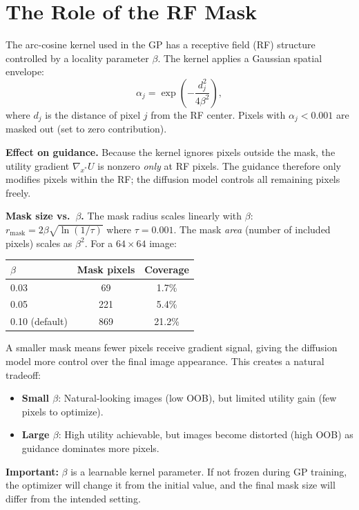 \documentclass[11pt]{article}
\begin{document}
\section{The Role of the RF Mask}

The arc-cosine kernel used in the GP has a receptive field (RF) structure
controlled by a locality parameter $\beta$.
The kernel applies a Gaussian spatial envelope:
\[
  \alpha_j = \exp\!\left(-\frac{d_j^2}{4\beta^2}\right),
\]
where $d_j$ is the distance of pixel $j$ from the RF center.
Pixels with $\alpha_j < 0.001$ are masked out (set to zero contribution).

\medskip
\noindent\textbf{Effect on guidance.}
Because the kernel ignores pixels outside the mask, the utility gradient
$\nabla_{x^*} U$ is nonzero \emph{only} at RF pixels.
The guidance therefore only modifies pixels within the RF;
the diffusion model controls all remaining pixels freely.

\medskip
\noindent\textbf{Mask size vs.\ $\beta$.}
The mask radius scales linearly with $\beta$:
$r_{\text{mask}} = 2\beta\sqrt{\ln(1/\tau)}$ where $\tau = 0.001$.
The mask \emph{area} (number of included pixels) scales as $\beta^2$.
For a $64 \times 64$ image:

\begin{center}
\begin{tabular}{@{}lcc@{}}
\toprule
$\beta$ & Mask pixels & Coverage \\
\midrule
0.03 & 69 & 1.7\% \\
0.05 & 221 & 5.4\% \\
0.10 (default) & 869 & 21.2\% \\
\bottomrule
\end{tabular}
\end{center}

A smaller mask means fewer pixels receive gradient signal, giving the diffusion
model more control over the final image appearance.
This creates a natural tradeoff:
\begin{itemize}
  \item \textbf{Small $\beta$}: Natural-looking images (low OOB), but limited
    utility gain (few pixels to optimize).
  \item \textbf{Large $\beta$}: High utility achievable, but images become
    distorted (high OOB) as guidance dominates more pixels.
\end{itemize}

\noindent\textbf{Important:} $\beta$ is a learnable kernel parameter.
If not frozen during GP training, the optimizer will change it from the
initial value, and the final mask size will differ from the intended setting.
\end{document}
